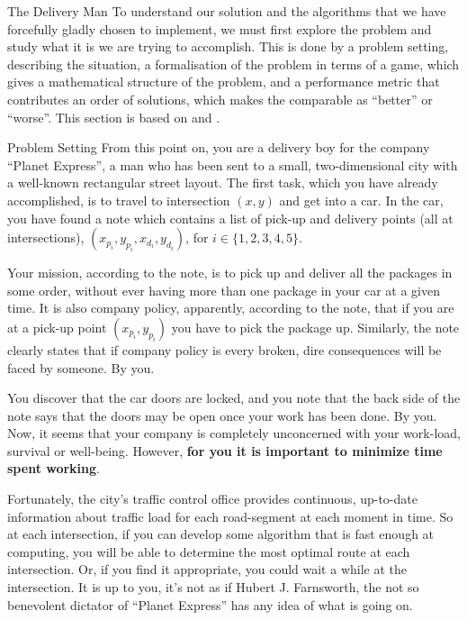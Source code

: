 \begin{section}{The Delivery Man}
  To understand our solution and the algorithms that we have forcefully gladly chosen to implement, we must first explore the problem and study what it is we are trying to accomplish. This is done by a problem setting, describing the situation, a formalisation of the problem in terms of a game, which gives a mathematical structure of the problem, and a performance metric that contributes an order of solutions, which makes the comparable as ``better'' or ``worse''. This section is based on \cite{run} and \cite{lab}.
  
  \begin{subsection}{Problem Setting}
    From this point on, you are a delivery boy for the company ``Planet Express'', a man who has been sent to a small, two-dimensional city with a well-known rectangular street layout. The first task, which you have already accomplished, is to travel to intersection $(x, y)$ and get into a car. In the car, you have found a note which contains a list of pick-up and delivery points (all at intersections), $(x_{p_i}, y_{p_i}, x_{d_i}, y_{d_i})$, for $i\in \{1,2,3,4, 5\}$. 

    Your mission, according to the note, is to pick up and deliver all the packages in some order, without ever having more than one package in your car at a given time. It is also company policy, apparently, according to the note, that if you are at a pick-up point $(x_{p_i}, y_{p_i})$ you have to pick the package up. Similarly, the note clearly states that if company policy is every broken, dire consequences will be faced by someone. By you.
    
    You discover that the car doors are locked, and you note that the back side of the note says that the doors may be open once your work has been done. By you. Now, it seems that your company is completely unconcerned with your work-load, survival or well-being. However, \textbf{for you it is important to minimize time spent working}.

    Fortunately, the city's traffic control office provides continuous, up-to-date information about traffic load for each road-segment at each moment in time. So at each intersection, if you can develop some algorithm that is fast enough at computing, you will be able to determine the most optimal route at each intersection. Or, if you find it appropriate, you could wait a while at the intersection. It is up to you, it's not as if Hubert J. Farnsworth, the not so benevolent dictator of ``Planet Express'' has any idea of what is going on.
  \end{subsection}


\end{section}
